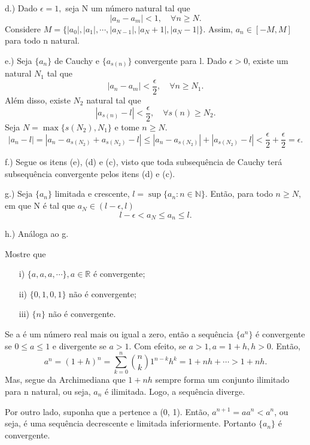 \documentclass[Analysis/analysis_notes.tex]{subfiles}
\begin{document}
\begin{proof*}
	d.) Dado $\epsilon = 1,$ seja N um n\'umero natural tal que
	$$
		|a_{n}-a_{m}| < 1,\quad\forall n\geq{N}.
	$$
	Considere $M = \{|a_{0}|, |a_{1}|, \cdots, |a_{N-1}|, |a_{N}+1|, |a_{N}-1|\}.$ Assim, $a_{n}\in[-M, M]$ para todo n natural.

	e.) Seja $\{a_{n}\}$ de Cauchy e $\{a_{s(n)}\}$ convergente para l. Dado $\epsilon > 0$, existe um natural $N_{1}$ tal que
	$$
		|a_{n}-a_{m}| < \frac{\epsilon}{2},\quad\forall n\geq{N_{1}}.
	$$
	Al\'em disso, existe $N_{2}$ natural tal que
	$$
		|a_{s(n)} - l| < \frac{\epsilon}{2},\quad\forall s(n)\geq{N_{2}}.
	$$
	Seja $N=\max\{s(N_{2}), N_{1}\}$ e tome $n\geq{N}.$
	$$
		|a_{n}-l| = |a_{n} - a_{s(N_{2})} + a_{s(N_{2})} - l| \leq{|a_{n}-a_{s(N_{2})}| + |a_{s(N_{2})} - l|} < \frac{\epsilon}{2} + \frac{\epsilon}{2} = \epsilon.
	$$

	f.) Segue os itens (e), (d) e (c), visto que toda subsequ\^encia de Cauchy ter\'a subsequ\^encia convergente pelos itens (d) e (c).

	g.) Seja $\{a_{n}\}$ limitada e crescente, $l = \sup\{a_{n}:n\in \mathbb{N}\}.$ Ent\~ao, para todo $n \geq{N}$, em que N \'e tal que $a_{N}\in(l-\epsilon, l)$
	$$
		l-\epsilon < a_{N}\leq{a_{n}} \leq{l}.
	$$

	h.) An\'aloga ao g.
\end{proof*}
\begin{example}
	Mostre que
	\begin{itemize}
		\item[i)] $\{a, a, a, \cdots\},a\in \mathbb{R}$ \'e convergente;
		\item[ii)] $\{0, 1, 0, 1\}$ n\~ao \'e convergente;
		\item[iii)] $\{n\}$ n\~ao \'e convergente.
	\end{itemize}
\end{example}
\begin{example}
	Se a \'e um n\'umero real mais ou igual a zero, ent\~ao a sequ\^encia $\{a^{n}\}$ \'e convergente se $0\leq{a}\leq{1}$ e divergente
	se $a > 1$. Com efeito, se $a > 1, a = 1 + h, h > 0$. Ent\~ao,
	$$
		a^{n} = (1+h)^{n} = \sum\limits_{k=0}^{n}\binom{n}{k}1^{n-k}h^{k} = 1 + nh + \cdots > 1 + nh.
	$$
	Mas, segue da Archimediana que $1 + nh$ sempre forma um conjunto ilimitado para n natural, ou seja, $a_{n}$ \'e ilimitada. Logo, a sequ\^encia
	diverge.

	Por outro lado, suponha que a pertence a (0, 1). Ent\~ao, $a^{n+1} = a a^{n} < a^{n}$, ou seja, \'e uma sequ\^encia decrescente e limitada inferiormente.
	Portanto $\{a_{n}\}$ \'e convergente.
\end{example}
\end{document}

